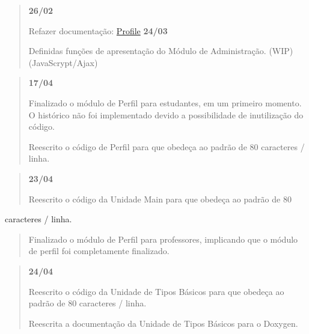 \begin{quotation}
{\bfseries 26/02}
\begin{DoxyItemize}
\item Refazer documentação\-: \hyperlink{namespaceProfile}{Profile} {\bfseries 24/03}
\item Definidas funções de apresentação do Módulo de Administração. (W\-I\-P) (Java\-Scrypt/\-Ajax)
\item 
\end{DoxyItemize}\end{quotation}


\begin{quotation}
{\bfseries 17/04}
\begin{DoxyItemize}
\item Finalizado o módulo de Perfil para estudantes, em um primeiro momento. O histórico não foi implementado devido a possibilidade de inutilização do código.
\item Reescrito o código de Perfil para que obedeça ao padrão de 80 caracteres / linha.
\end{DoxyItemize}

\end{quotation}


\begin{quotation}
{\bfseries 23/04}
\begin{DoxyItemize}
\item Reescrito o código da Unidade Main para que obedeça ao padrão de 80
\end{DoxyItemize}

\end{quotation}
caracteres / linha. \begin{quotation}

\begin{DoxyItemize}
\item Finalizado o módulo de Perfil para professores, implicando que o módulo de perfil foi completamente finalizado.
\end{DoxyItemize}

\end{quotation}


\begin{quotation}
{\bfseries 24/04}
\begin{DoxyItemize}
\item Reescrito o código da Unidade de Tipos Básicos para que obedeça ao padrão de 80 caracteres / linha.
\item Reescrita a documentação da Unidade de Tipos Básicos para o Doxygen.
\end{DoxyItemize}

\end{quotation}


